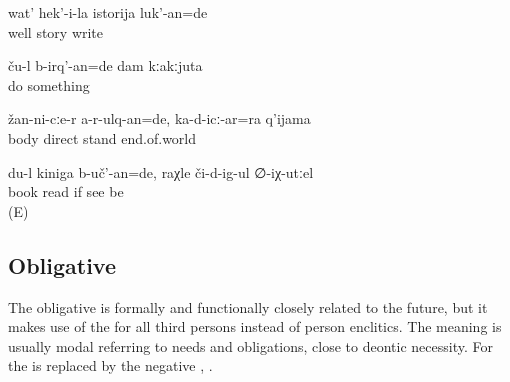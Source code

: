 \begin{exe}
	\ex	\label{ex:‎Her story (i.e. autobiography) should be written down}
	\gll	wat'	hek'-i-la	istorija	luk'-an=de\\
		well		story	write\\
	\glt	{}

	\ex	\label{ex:They would/should have done something for me}
	\gll	ču-l	b-irq'-an=de	dam	kːakːjuta \\
			do		something\\
	\glt	{}

	\ex	\label{ex:You should have not left your body, even if the end of the world comes}
	\gll	žan-ni-cːe-r	a-r-ulq-an=de,		ka-d-icː-ar=ra	q'ijama\\
		body	direct		stand	end.of.world\\
	\glt	{}

	\ex	\label{ex:I would have read the book if you (masc.) would have seen it}
	\gll	du-l	kiniga	b-uč'-an=de,	raχle	či-d-ig-ul	∅-iχ-utːel\\
			book	read	if	see	be\\
	\glt	{} (E)
\end{exe}



\subsection{Obligative}
\label{ssec:Obligative}

The obligative is formally and functionally closely related to the future, but it makes use of the  for all third persons instead of person enclitics. The meaning is usually modal referring to needs and obligations, close to deontic necessity. For  the   is replaced by the negative   , .

